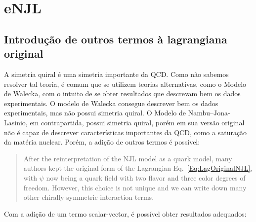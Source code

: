 \section{eNJL}

\subsection{Introdução de outros termos à lagrangiana original}
\label{Sec:Introducao_termos_lag_NJL}

A simetria quiral é uma simetria importante da QCD\cite{Koch}. Como não sabemos resolver tal teoria, é comum que se utilizem teorias alternativas, como o Modelo de Walecka, com o intuito de se obter resultados que descrevam bem os dados experimentais. O modelo de Walecka consegue descrever bem os dados experimentais, mas não possui simetria quiral. O Modelo de Nambu--Jona-Lasinio, em contrapartida, possui simetria quiral, porém em sua versão original não é capaz de descrever características importantes da QCD, como a saturação da matéria nuclear. Porém, a adição de outros termos é possível:\cite{Buballa}
\begin{quote}
After the reinterpretation of the NJL model as a quark model, many authors kept the original form of the Lagrangian Eq.~\eqref{Eq:LagOriginalNJL}, with $\psi$ now being a quark field with two flavor and three color degrees of freedom. However, this choice is not unique and we can write down many other chirally symmetric interaction terms.
\end{quote}
%
Com a adição de um termo scalar-vector, é possível obter resultados adequados\cite{Koch}:
